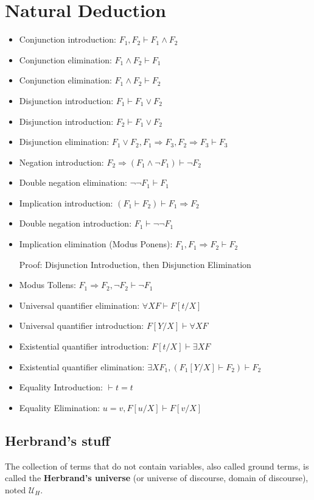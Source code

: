 \documentclass[11pt, twocolumn]{article}
\newenvironment{compactitem}
{\begin{itemize}
  \setlength{\itemsep}{1px}
  \setlength{\parskip}{0pt}
  \setlength{\parsep}{0pt}}
{\end{itemize}}
\begin{document}
\section{Natural Deduction}
\begin{compactitem}
\item Conjunction introduction: $F_1, F_2 \vdash F_1 \wedge F_2$
\item Conjunction elimination: $F_1 \wedge F_2 \vdash F_1$
\item Conjunction elimination: $F_1 \wedge F_2 \vdash F_2$
\item Disjunction introduction: $F_1 \vdash F_1\vee F_2$
\item Disjunction introduction: $F_2 \vdash F_1\vee F_2$
\item Disjunction elimination: $F_1 \vee F_2, F_1\Rightarrow F_3, F_2\Rightarrow F_3 \vdash F_3$
\item Negation introduction: $F_2 \Rightarrow (F_1 \wedge \neg F_1) \vdash \neg F_2$
\item Double negation elimination: $\neg \neg F_1 \vdash F_1$
\item Implication introduction: $(F_1 \vdash F_2)\vdash F_1\Rightarrow F_2$
\item Double negation introduction: $F_1 \vdash \neg\neg F_1$
\item Implication elimination (Modus Ponens): $F_1, F_1 \Rightarrow F_2 \vdash F_2$

Proof: Disjunction Introduction, then Disjunction Elimination
\item Modus Tollens: $F_1\Rightarrow F_2, \neg F_2 \vdash \neg F_1$
\item Universal quantifier elimination: $\forall X F \vdash F[t/X]$
\item Universal quantifier introduction: $F[Y/X] \vdash \forall X F$
\item Existential quantifier introduction: $F[t/X] \vdash \exists X F$
\item Existential quantifier elimination: $\exists X F_1, (F_1[Y/X] \vdash F_2) \vdash F_2$
\item Equality Introduction: $\vdash t = t$
\item Equality Elimination: $u = v, F[u/X] \vdash F[v/X]$
\end{compactitem}
\subsection{Herbrand's stuff}
The collection of terms that do not contain variables, also called ground terms, is called the \textbf{Herbrand's universe} (or universe of discourse, domain of discourse), noted $\mathcal{U}_H$.
\end{document}
